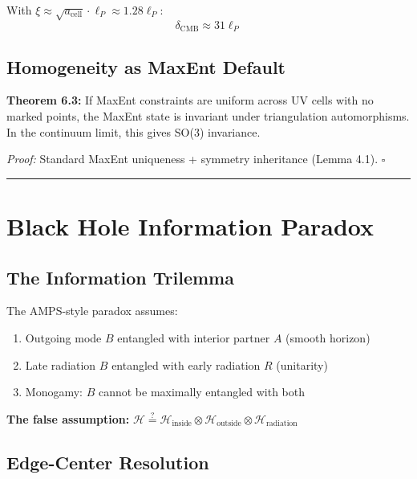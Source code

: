 With \(\xi \approx \sqrt{a_{\text{cell}}} \cdot \ell_P \approx 1.28 \ell_P\): \[\delta_{\text{CMB}} \approx 31 \ell_P\]

\subsection{Homogeneity as MaxEnt Default}\label{63-homogeneity-as-maxent-default}

\textbf{Theorem 6.3:} If MaxEnt constraints are uniform across UV cells with no marked points, the MaxEnt state is invariant under triangulation automorphisms. In the continuum limit, this gives SO(3) invariance.

\emph{Proof:} Standard MaxEnt uniqueness + symmetry inheritance (Lemma 4.1). \(\square\)

\begin{center}\rule{0.5\linewidth}{0.5pt}\end{center}

\section{Black Hole Information Paradox}\label{7-black-hole-information-paradox}

\subsection{The Information Trilemma}\label{71-the-information-trilemma}

The AMPS-style paradox assumes:

\begin{enumerate}
\def\labelenumi{\arabic{enumi}.}
\tightlist
\item
 Outgoing mode \(B\) entangled with interior partner \(A\) (smooth horizon)
\item
 Late radiation \(B\) entangled with early radiation \(R\) (unitarity)
\item
 Monogamy: \(B\) cannot be maximally entangled with both
\end{enumerate}

\textbf{The false assumption:} \(\mathcal{H} \stackrel{?}{=} \mathcal{H}_{\text{inside}} \otimes \mathcal{H}_{\text{outside}} \otimes \mathcal{H}_{\text{radiation}}\)

\subsection{Edge-Center Resolution}\label{72-edge-center-resolution}

